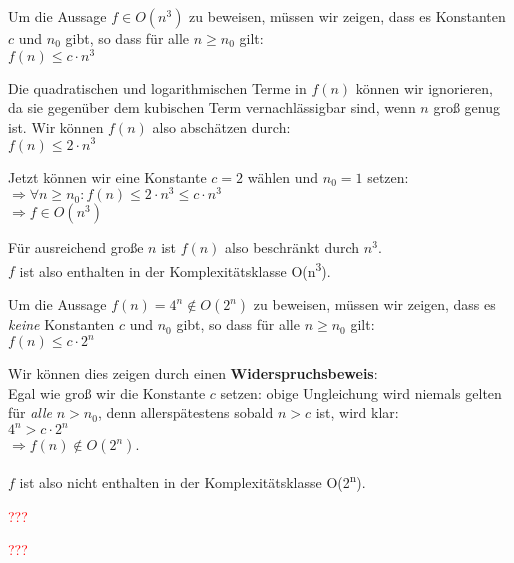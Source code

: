 \newpage
\begin{aufgabe}%
\begin{teile}
	\item
	Um die Aussage $f \in O(n^3)$ zu beweisen, müssen wir zeigen, dass es Konstanten $c$ und $n_0$ gibt, so dass für alle $n \geq n_0$ gilt:\\
	$f(n) \leq c \cdot n^3$ 
	
	Die quadratischen und logarithmischen Terme in $f(n)$ können wir ignorieren, da sie gegenüber dem kubischen Term vernachlässigbar sind, wenn $n$ groß genug ist. Wir können $f(n)$ also abschätzen durch: \\
	$f(n) \leq 2 \cdot n^3$ 
	
	Jetzt können wir eine Konstante $c=2$ wählen und $n_0=1$ setzen: \\ 
	$\Rightarrow \forall n \geq n_0: f(n) \leq 2 \cdot n^3 \leq c \cdot n^3$ \\
	$\Rightarrow f \in O(n^3)$ 
	
	Für ausreichend große $n$ ist $f(n)$ also beschränkt durch $n^3$. \\ 
	$f$ ist also enthalten in der Komplexitätsklasse O(n\textsuperscript{3}). \\
	
	\item
	Um die Aussage $f(n) = 4^n \notin O(2^n)$ zu beweisen, müssen wir zeigen, dass es \textit{keine} Konstanten $c$ und $n_0$ gibt, so dass für alle $n \geq n_0$ gilt: \\ 
	$f(n) \leq c \cdot 2^n$ 
	
	Wir können dies zeigen durch einen \textbf{Widerspruchsbeweis}: \\
	Egal wie groß wir die Konstante $c$ setzen: obige Ungleichung wird niemals gelten für \textit{alle} $n > n_0$, denn allerspätestens sobald $n > c$ ist, wird klar: \\
	$4^n > c \cdot 2^n$ \\
	$\Rightarrow f(n) \notin O(2^n)$. 
	
	$f$ ist also nicht enthalten in der Komplexitätsklasse O(2\textsuperscript{n}). \\
	
	\item \textcolor{red}{???} \\
	\item \textcolor{red}{???} \\
\end{teile}	
\end{aufgabe}


